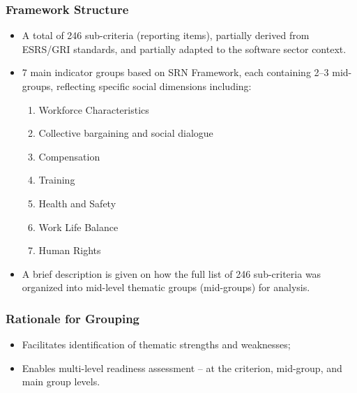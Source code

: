 \subsubsection{Framework Structure}
\begin{itemize}
    \item A total of 246 sub-criteria (reporting items), partially derived from ESRS/GRI standards, and partially adapted to the software sector context.
    \item 7 main indicator groups based on SRN Framework, each containing 2--3 mid-groups, reflecting specific social dimensions including:
    \begin{enumerate}
        \item Workforce Characteristics
        \item Collective bargaining and social dialogue
        \item Compensation
        \item Training
        \item Health and Safety
        \item Work Life Balance
        \item Human Rights
    \end{enumerate}
    \item A brief description is given on 
    how the full list of 246 sub-criteria was organized into mid-level thematic groups (mid-groups) for analysis. 
\end{itemize}

\subsubsection{Rationale for Grouping}
\begin{itemize}
    \item Facilitates identification of thematic strengths and weaknesses;
    \item Enables multi-level readiness assessment -- at the criterion, mid-group, and main group levels.
\end{itemize}

